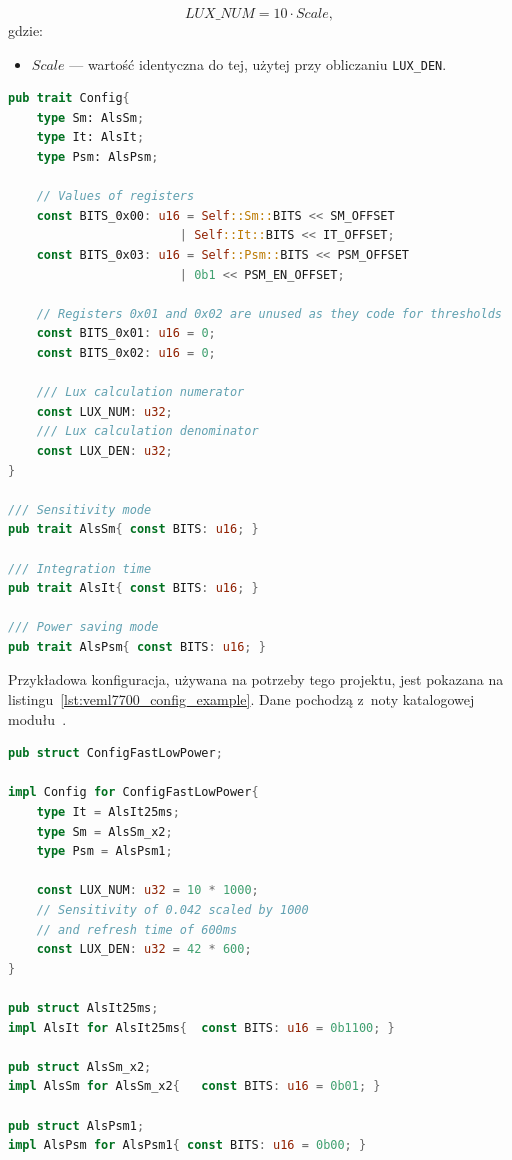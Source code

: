 \begin{equation}
    LUX\_NUM = 10 \cdot Scale,
    \label{eq:veml7700_lux_num}
\end{equation}
\noindent gdzie:
\begin{itemize}
    \item $Scale$ --- wartość identyczna do tej, użytej przy obliczaniu
    \texttt{LUX\_DEN}.
\end{itemize}

\begin{lstlisting}[language=Rust, style=colouredRust, 
    caption={Cecha \texttt{Config} dla VEML7700},
    label={lst:veml7700_config}
]
pub trait Config{
    type Sm: AlsSm;
    type It: AlsIt;
    type Psm: AlsPsm;

    // Values of registers
    const BITS_0x00: u16 = Self::Sm::BITS << SM_OFFSET 
                        | Self::It::BITS << IT_OFFSET;
    const BITS_0x03: u16 = Self::Psm::BITS << PSM_OFFSET 
                        | 0b1 << PSM_EN_OFFSET;

    // Registers 0x01 and 0x02 are unused as they code for thresholds
    const BITS_0x01: u16 = 0;
    const BITS_0x02: u16 = 0;

    /// Lux calculation numerator
    const LUX_NUM: u32;
    /// Lux calculation denominator
    const LUX_DEN: u32;
}

/// Sensitivity mode
pub trait AlsSm{ const BITS: u16; }

/// Integration time
pub trait AlsIt{ const BITS: u16; }

/// Power saving mode
pub trait AlsPsm{ const BITS: u16; }
\end{lstlisting}

Przykładowa konfiguracja, używana na potrzeby tego projektu, jest pokazana na 
listingu~\ref{lst:veml7700_config_example}. Dane pochodzą z~noty katalogowej
modułu~\cite{veml7700_datasheet}.

\begin{lstlisting}[language=Rust, style=colouredRust, 
    caption={Przykładowa konfiguracja dla modułu VEML7700},
    label={lst:veml7700_config_example}
]
pub struct ConfigFastLowPower;

impl Config for ConfigFastLowPower{
    type It = AlsIt25ms;
    type Sm = AlsSm_x2;
    type Psm = AlsPsm1;

    const LUX_NUM: u32 = 10 * 1000;
    // Sensitivity of 0.042 scaled by 1000
    // and refresh time of 600ms
    const LUX_DEN: u32 = 42 * 600;
}

pub struct AlsIt25ms;
impl AlsIt for AlsIt25ms{  const BITS: u16 = 0b1100; }

pub struct AlsSm_x2;
impl AlsSm for AlsSm_x2{   const BITS: u16 = 0b01; }

pub struct AlsPsm1;
impl AlsPsm for AlsPsm1{ const BITS: u16 = 0b00; }
\end{lstlisting}

